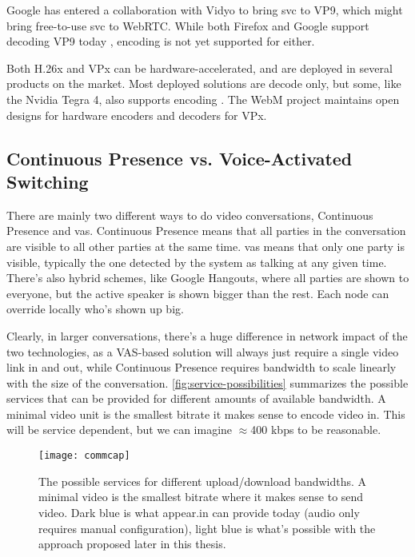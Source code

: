 Google has entered a collaboration with Vidyo \cite{vp9-vidyo} to bring \gls{svc} to VP9, which might bring free-to-use \gls{svc} to WebRTC. While both Firefox and Google support decoding VP9 today \cite{vp9-support}, encoding is not yet supported for either.

Both H.26x and VPx can be hardware-accelerated, and are deployed in several products on the market. Most deployed solutions are decode only, but some, like the Nvidia Tegra 4, also supports encoding \cite{nvidia-hw-encode}. The WebM project maintains open designs for hardware encoders and decoders for VPx.


\subsection{Continuous Presence vs. Voice-Activated Switching}

There are mainly two different ways to do video conversations, Continuous Presence and \acrfull{vas}. Continuous Presence means that all parties in the conversation are visible to all other parties at the same time. \gls{vas} means that only one party is visible, typically the one detected by the system as talking at any given time. There's also hybrid schemes, like Google Hangouts, where all parties are shown to everyone, but the active speaker is shown bigger than the rest. Each node can override locally who's shown up big.

Clearly, in larger conversations, there's a huge difference in network impact of the two technologies, as a VAS-based solution will always just require a single video link in and out, while Continuous Presence requires bandwidth to scale linearly with the size of the conversation. \autoref{fig:service-possibilities} summarizes the possible services that can be provided for different amounts of available bandwidth. A minimal video unit is the smallest bitrate it makes sense to encode video in. This will be service dependent, but we can imagine $\approx$400 kbps to be reasonable.

\begin{figure}
    \centering
    \texttt{[image: commcap]}
    \caption{The possible services for different upload/download bandwidths. A minimal video is the smallest bitrate where it makes sense to send video. Dark blue is what appear.in can provide today (audio only requires manual configuration), light blue is what's possible with the approach proposed later in this thesis.}
    \label{fig:service-possibilities}
\end{figure}

